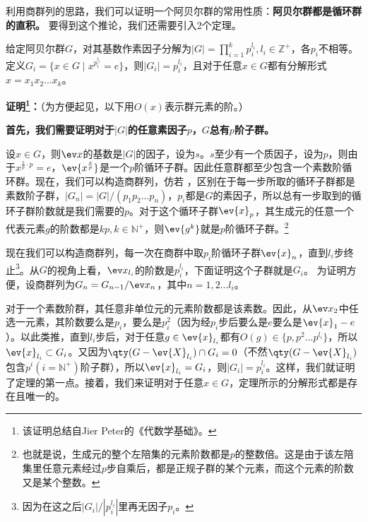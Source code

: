 

利用商群列的思路，我们可以证明一个阿贝尔群的常用性质：\textbf{阿贝尔群都是循环群的直积。
}要得到这个推论，我们还需要引入2个定理。
\begin{theorem}{}
给定阿贝尔群$G$，对其基数作素因子分解为$|G|=\prod_{i=1}^{k} p_{i}^{l_{i}},l_i\in\mathbb{Z}^+$，各$p_i$不相等。
定义$G_i = \{x \in G \mid x^{p_i^{l_i}} = e\}$，则$|G_i|=p_i^{l_i}$，且对于任意$x\in G$都有分解形式$x=x_1x_2...x_k$。
\end{theorem}
\textbf{证明\footnote{该证明总结自Jier Peter的《代数学基础》。}：}（为方便起见，以下用$O(x)$表示群元素的阶。）

\textbf{首先，我们需要证明对于$|G|$的任意素因子$p$，$G$总有$p$阶子群。}

设$x\in G$，则$\ev x$的基数是$|G|$的因子，设为$s$。$s$至少有一个质因子，设为$p$，则由于$x^{\frac{s}{p}\cdot p}=e$，$\ev {x^{\frac{s}{p}}}$是一个$p$阶循环子群。因此任意群都至少包含一个素数阶循环群。现在，我们可以构造商群列，仿若    ，区别在于每一步所取的循环子群都是素数阶子群，$|G_n|=|G|/(p_1p_2...p_n)$，$p_i$都是$G$的素因子，所以总有一步取到的循环子群阶数就是我们需要的$p$。对于这个循环子群$\ev {x}_p$，其生成元的任意一个代表元素$g$的阶数都是$kp,k\in \mathbb N^{+}$，则$\ev{g^k}$就是$p$阶循环子群。\footnote{也就是说，生成元的整个左陪集的元素阶数都是$p$的整数倍。这是由于该左陪集里任意元素经过$p$步自乘后，都是正规子群的某个元素，而这个元素的阶数又是某个整数。}

现在我们可以构造商群列，每一次在商群中取$p_i$阶循环子群$\ev{x}_{n}$，直到$l_i$步终止\footnote{因为在这之后$|G_i|/|p_i^{l_i}|$里再无因子$p_i$。}。从$G$的视角上看，$\ev x_{l_i}$的阶数是$p_i^{l_i}$，下面证明这个子群就是$G_i$。
为证明方便，设商群列为$G_n=G_{n-1}/\ev x_n$，其中$ n=1,2...l_i$。

对于一个素数阶群，其任意非单位元的元素阶数都是该素数。因此，从$\ev x_2$中任选一元素，其阶数要么是$p_i$，要么是$p_i^2$（因为经$p_i$步后要么是$e$要么是$\ev{x}_1-e$）。以此类推，直到$l_i$步后，对于任意$g\in\ev{x}_{l_i}$都有$O(g)\in\{p,p^2...p^{l_i}\}$，所以$\ev{x}_{l_i}\subset G_i$。又因为$\qty (G-\ev{X}_{l_i})\cap G_i=0$（不然$\qty (G-\ev{X}_{l_i})$包含$p^i(i=\mathbb N^{+})$阶子群），所以$\ev{x}_{l_i}=G_i$，则$|G_i|=p_i^{l_i}$。这样，我们就证明了定理的第一点。接着，我们来证明对于任意$x\in G$，定理所示的分解形式都是存在且唯一的。

